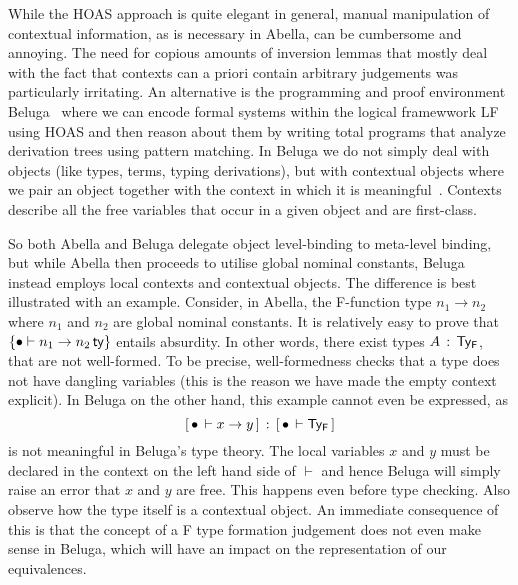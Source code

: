 \newcommand{\tax}{\textsf{t\_ax}}
\newcommand{\tpi}{\textsf{t\_pi}~}
\newcommand{\tlam}{\textsf{t\_lam}~}
\newcommand{\tapp}{\textsf{t\_app}~}
\newcommand{\ptc}{\textsf{p\_tc}}

\newcommand{\rall}{\textsf{r\_all}}
\newcommand{\rarr}{\textsf{r\_arr}}
\newcommand{\rapp}{\textsf{r\_app}}
\newcommand{\rtapp}{\textsf{r\_App}}
\newcommand{\rlam}{\textsf{r\_lam}}
\newcommand{\rtlam}{\textsf{r\_Lam}}

\newcommand{\D}{\mathcal{D}}

While the HOAS approach is quite elegant in general,  manual manipulation of contextual information, as is necessary in Abella, can be cumbersome and annoying.
The need for copious amounts of inversion lemmas that mostly deal with the fact that contexts can a priori contain arbitrary judgements was particularly irritating.
An alternative is the programming and proof environment Beluga~\cite{Pientka:IJCAR10,Pientka:FLOPS10,Pientka:CADE15} where we can encode formal systems within the logical framewwork LF~\cite{Harper93jacm} using HOAS and then reason about them by writing total programs that analyze derivation trees using pattern matching.
In Beluga we do not simply deal with objects (like types, terms, typing derivations), but with contextual objects where we pair an object together with the context in which it is meaningful~\cite{Nanevski:ICML05,Pientka:POPL08}.
Contexts describe all the free variables that occur in a given object and are first-class.

So both Abella and Beluga delegate object level-binding to meta-level binding, but while Abella then proceeds to utilise global nominal constants, Beluga instead employs local contexts and contextual objects.
The difference is best illustrated with an example.
Consider, in Abella, the F-function type $n_1 \to n_2$ where $n_1$ and $n_2$ are global nominal constants.
It is relatively easy to prove that $\{\bullet \vdash n_1 \to n_2\,\mathsf{ty}\}$ entails absurdity.
In other words, there exist types $A \mathrel{\, : \,} \mathsf{Ty_{F}}$, that are not well-formed.
To be precise, well-formedness checks that a type does not have dangling variables (this is the reason we have made the empty context explicit).
%
\newcommand{\bc}[2]{\ensuremath{[\,#1\,\vdash #2\,]}}
In Beluga on the other hand, this example cannot even be expressed, as \[\bc{\emptyctx}{x \to y} \OF \bc{\emptyctx}{\TyF}\] is not meaningful in Beluga's type theory. The local variables $x$ and $y$ must be declared in the context on the left hand side of $\vdash$ and hence Beluga will simply raise an error that $x$ and $y$ are free. This happens even before type checking. Also observe how the type itself is a contextual object. An immediate consequence of this is that the concept of a F type formation judgement does not even make sense in Beluga, which will have an impact on the representation of our equivalences.

